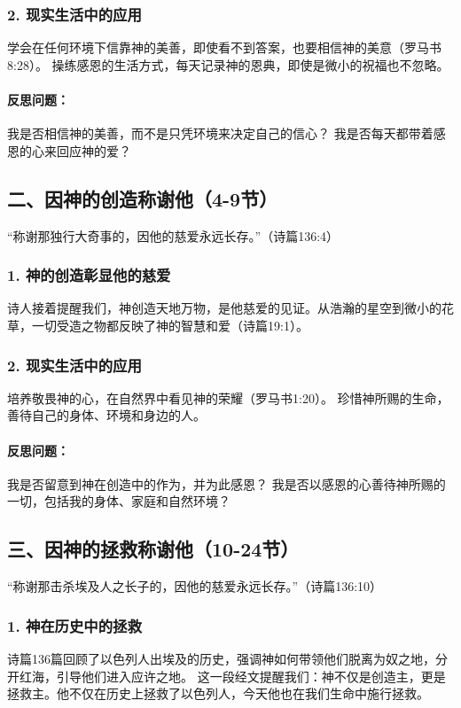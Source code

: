 \documentclass[a4paper, 12pt]{article}
\begin{document}
\subsubsection*{2. 现实生活中的应用}
学会在任何环境下信靠神的美善，即使看不到答案，也要相信神的美意（罗马书8:28）。
操练感恩的生活方式，每天记录神的恩典，即使是微小的祝福也不忽略。
\paragraph*{反思问题：}

我是否相信神的美善，而不是只凭环境来决定自己的信心？
我是否每天都带着感恩的心来回应神的爱？
\subsection*{二、因神的创造称谢他（4-9节）}
“称谢那独行大奇事的，因他的慈爱永远长存。”（诗篇136:4）

\subsubsection*{1. 神的创造彰显他的慈爱}
诗人接着提醒我们，神创造天地万物，是他慈爱的见证。从浩瀚的星空到微小的花草，一切受造之物都反映了神的智慧和爱（诗篇19:1）。

\subsubsection*{2. 现实生活中的应用}
培养敬畏神的心，在自然界中看见神的荣耀（罗马书1:20）。
珍惜神所赐的生命，善待自己的身体、环境和身边的人。
\paragraph*{反思问题：}

我是否留意到神在创造中的作为，并为此感恩？
我是否以感恩的心善待神所赐的一切，包括我的身体、家庭和自然环境？
\subsection*{三、因神的拯救称谢他（10-24节）}
“称谢那击杀埃及人之长子的，因他的慈爱永远长存。”（诗篇136:10）

\subsubsection*{1. 神在历史中的拯救}
诗篇136篇回顾了以色列人出埃及的历史，强调神如何带领他们脱离为奴之地，分开红海，引导他们进入应许之地。
这一段经文提醒我们：神不仅是创造主，更是拯救主。他不仅在历史上拯救了以色列人，今天他也在我们生命中施行拯救。
\end{document}
